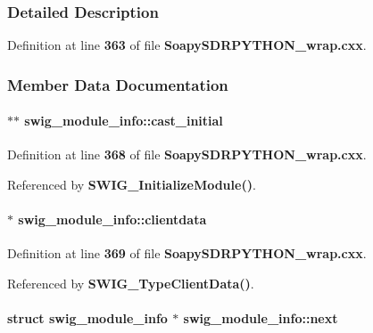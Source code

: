 \subsubsection{Detailed Description}


Definition at line {\bf 363} of file {\bf Soapy\+S\+D\+R\+P\+Y\+T\+H\+O\+N\+\_\+wrap.\+cxx}.



\subsubsection{Member Data Documentation}
\paragraph[{cast\+\_\+initial}]{ $\ast$$\ast$ swig\+\_\+module\+\_\+info\+::cast\+\_\+initial}\label{structswig__module__info_a14e4f7b0c9e0ff10543475c269b83507}


Definition at line {\bf 368} of file {\bf Soapy\+S\+D\+R\+P\+Y\+T\+H\+O\+N\+\_\+wrap.\+cxx}.



Referenced by {\bf S\+W\+I\+G\+\_\+\+Initialize\+Module()}.

\paragraph[{clientdata}]{ $\ast$ swig\+\_\+module\+\_\+info\+::clientdata}\label{structswig__module__info_a39999692b76f191b66a5ce746681dc84}


Definition at line {\bf 369} of file {\bf Soapy\+S\+D\+R\+P\+Y\+T\+H\+O\+N\+\_\+wrap.\+cxx}.



Referenced by {\bf S\+W\+I\+G\+\_\+\+Type\+Client\+Data()}.

\paragraph[{next}]{\setlength{\rightskip}{0pt plus 5cm}struct {\bf swig\+\_\+module\+\_\+info} $\ast$ swig\+\_\+module\+\_\+info\+::next}\label{structswig__module__info_adc59649870cda1ab12f45e57de99e572}


